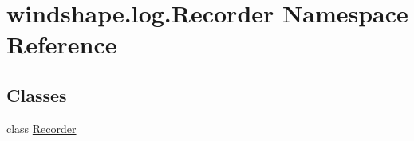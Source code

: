 \hypertarget{namespacewindshape_1_1log_1_1_recorder}{}\section{windshape.\+log.\+Recorder Namespace Reference}
\label{namespacewindshape_1_1log_1_1_recorder}
\subsection*{Classes}
\begin{DoxyCompactItemize}
\item 
class \mbox{\hyperlink{classwindshape_1_1log_1_1_recorder_1_1_recorder}{Recorder}}
\end{DoxyCompactItemize}
